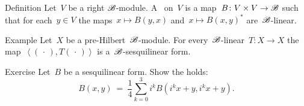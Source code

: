 \documentclass[b]{subfiles}
\begin{document}
\begin{parsec}%
\begin{point}{Definition}%
Let~$V$ be a right $\mathscr{B}$-module.
A~ on~$V$
    is a map~$B\colon V\times V \to \mathscr{B}$
    such that for each~$y\in V$
    the maps~$x \mapsto B(y, x)$
        and~$x \mapsto B(x,y)^*$ are~$\mathscr{B}$-linear.
\end{point}
\begin{point}{Example}%
Let~$X$ be a pre-Hilbert~$\mathscr{B}$-module.
For every~$\mathscr{B}$-linear~$T\colon X \to X$
    the map~$\left<(\,\cdot\,), T (\,\cdot\,)\right>$
    is a~$\mathscr{B}$-sesquilinear form.
\end{point}
\begin{point}{Exercise}
Let~$B$ be a sesquilinear form.
Show the  holds:
\begin{equation*}
    B(x,y) \ =\  \frac{1}{4} \sum_{k=0}^3 i^k B(i^k x + y, i^k x + y).
\end{equation*}
\end{point}
\end{parsec}
\end{document}
